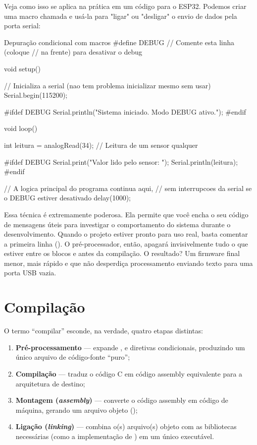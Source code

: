Veja como isso se aplica na prática em um código para o ESP32. Podemos criar uma macro chamada  e usá-la para "ligar" ou "desligar" o envio de dados pela porta serial:

\begin{codigoc}{Depuração condicional com macros}
#define DEBUG  // Comente esta linha (coloque // na frente) para desativar o debug

void setup() {
    // Inicializa a serial (nao tem problema inicializar mesmo sem usar)
    Serial.begin(115200);

    #ifdef DEBUG
        Serial.println("Sistema iniciado. Modo DEBUG ativo.");
    #endif
}

void loop() {
    int leitura = analogRead(34); // Leitura de um sensor qualquer

    #ifdef DEBUG
        Serial.print("Valor lido pelo sensor: ");
        Serial.println(leitura);
    #endif

    // A logica principal do programa continua aqui, 
    // sem interrupcoes da serial se o DEBUG estiver desativado
    delay(1000);
}
\end{codigoc}

Essa técnica é extremamente poderosa. Ela permite que você encha o seu código de mensagens úteis para investigar o comportamento do sistema durante o desenvolvimento. Quando o projeto estiver pronto para uso real, basta comentar a primeira linha (). O pré-processador, então, apagará invisivelmente tudo o que estiver entre os blocos  e  antes da compilação. O resultado? Um firmware final menor, mais rápido e que não desperdiça processamento enviando texto para uma porta USB vazia.

\section{Compilação}
\label{sec:compilacao}

O termo ``compilar'' esconde, na verdade, quatro etapas distintas:

\begin{enumerate}
    \item \textbf{Pré-processamento} — expande ,  e diretivas condicionais, produzindo um único arquivo de código-fonte ``puro'';
    \item \textbf{Compilação} — traduz o código C em código assembly equivalente para a arquitetura de destino;
    \item \textbf{Montagem (\emph{assembly})} — converte o código assembly em código de máquina, gerando um arquivo objeto ();
    \item \textbf{Ligação (\emph{linking})} — combina o(s) arquivo(s) objeto com as bibliotecas necessárias (como a implementação de ) em um único executável.
\end{enumerate}

